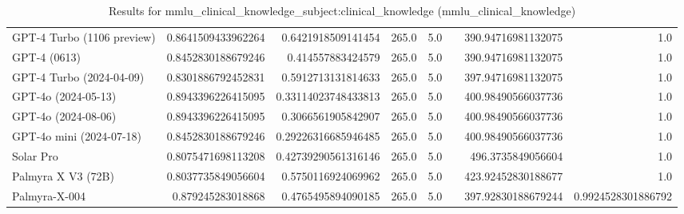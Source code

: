 \begin{table}[htp]
{\begin{tabular}{lrrrrrrr}
GPT-4 Turbo (1106 preview) & 0.8641509433962264 & 0.6421918509141454 & 265.0 & 5.0 &  & 390.94716981132075 & 1.0 \\
GPT-4 (0613) & 0.8452830188679246 & 0.414557883424579 & 265.0 & 5.0 &  & 390.94716981132075 & 1.0 \\
GPT-4 Turbo (2024-04-09) & 0.8301886792452831 & 0.5912713131814633 & 265.0 & 5.0 &  & 397.94716981132075 & 1.0 \\
GPT-4o (2024-05-13) & 0.8943396226415095 & 0.33114023748433813 & 265.0 & 5.0 &  & 400.98490566037736 & 1.0 \\
GPT-4o (2024-08-06) & 0.8943396226415095 & 0.3066561905842907 & 265.0 & 5.0 &  & 400.98490566037736 & 1.0 \\
GPT-4o mini (2024-07-18) & 0.8452830188679246 & 0.29226316685946485 & 265.0 & 5.0 &  & 400.98490566037736 & 1.0 \\
Solar Pro & 0.8075471698113208 & 0.42739290561316146 & 265.0 & 5.0 &  & 496.3735849056604 & 1.0 \\
Palmyra X V3 (72B) & 0.8037735849056604 & 0.5750116924069962 & 265.0 & 5.0 &  & 423.92452830188677 & 1.0 \\
Palmyra-X-004 & 0.879245283018868 & 0.4765495894090185 & 265.0 & 5.0 &  & 397.92830188679244 & 0.9924528301886792 \\
\bottomrule
\end{tabular}}
\caption{Results for mmlu_clinical_knowledge_subject:clinical_knowledge (mmlu_clinical_knowledge)}
\label{fig:mmlu_clinical_knowledge_subject:clinical_knowledge (mmlu_clinical_knowledge)}
\end{table}